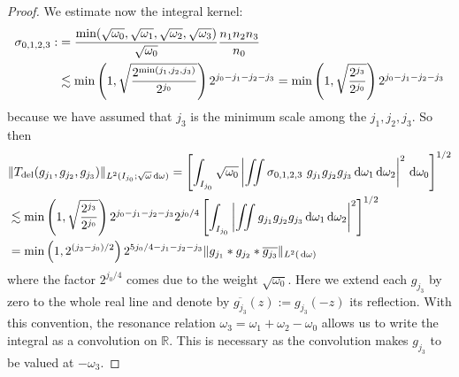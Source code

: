 \documentclass[reqno,11pt,letterpaper]{amsart}
\numberwithin{equation}{section}
\newcommand{\dd}{\, {\rm d}}
\begin{document}
\begin{proof}
        We estimate now the integral kernel:
        \begin{align}
            \sigma_{0,1,2,3}:&= \frac{\text{min}(\sqrt{\omega_0},\sqrt{\omega_1},\sqrt{\omega_2},\sqrt{\omega_3})}{\sqrt{\omega_0}} 
   \frac{n_1n_2n_3}{n_0}\notag \\
   &\lesssim \min \left(1,
   \sqrt{
   \frac{2^{\min(j_1,j_2,j_3)}}{2^{j_0}} 
   } \right) 2^{j_0 - j_1-j_2-j_3}  = \min \left(1,
   \sqrt{
   \frac{2^{j_3}}{2^{j_0}} 
   } \right) 2^{j_0 - j_1-j_2-j_3}
        \end{align}
        because we have assumed that $j_3$ is the minimum scale among the $j_1,j_2,j_3$. So then 
        \begin{equation} \label{eq:cubic term_dydadic}
            \begin{split}
                &\|T_{\text{del}}(g_{j_1},g_{j_2},g_{j_3})  \|_{L^2(I_{j_0};\sqrt{\omega}\dd \omega)}   = 
                \left[ \int_{I_{j_0}}\sqrt{\omega_0} \left\vert
                \iint \sigma_{0,1,2,3}  \ g_{j_1}g_{j_2}g_{j_3} \dd \omega_1 \dd \omega_2 
                \right\vert^2 \dd \omega_0\right]^{1/2}\\
                & \lesssim \min \left(1, \sqrt{
     \frac{2^{j_3}}{2^{j_0}} 
   } \right) 2^{j_0-j_1-j_2-j_3} 2^{j_0/4} 
   \left[ \int_{I_{j_0}}  \left\vert 
   \iint g_{j_1}g_{j_2}g_{j_3}\dd \omega_1\dd \omega_2
   \right\vert^2
   \right]^{1/2} \\
   &  = \min \left(1, 2^{(j_3-j_0)/2} \right) 2^{5 j_0/4-j_1-j_2-j_3}
   \| g_{j_1} \ast g_{j_2} \ast \overline{g_{j_3}} \|_{L^2(\dd \omega)}
            \end{split}
        \end{equation}
        where the factor $2^{j_0/4}$ comes due to the weight $\sqrt{\omega_0}$. Here we extend each $g_{j_3}$ by zero to the whole real line and denote by
$\overline{g_{j_3}}(z):=g_{j_3}(-z)$ its reflection. With this convention,
the resonance relation $\omega_3=\omega_1+\omega_2-\omega_0$ allows us to write the integral as a convolution on $\mathbb{R}$. This is necessary as the convolution makes $g_{j_3}$ to be valued at $-\omega_3$. 
        

\end{proof}
\end{document}

